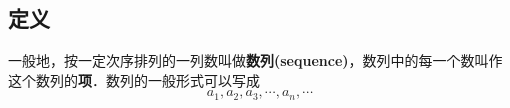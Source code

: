 
\begin{issues}
\issueDraft
\end{issues}

\subsection{定义}
一般地，按一定次序排列的一列数叫做\textbf{数列(sequence)}，数列中的每一个数叫作这个数列的\textbf{项}．数列的一般形式可以写成
\begin{equation}
a_1,a_2,a_3,\cdots,a_n,\cdots
\end{equation}